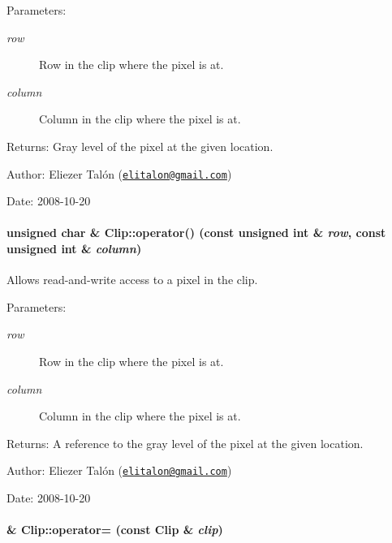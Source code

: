 \begin{Desc}
\item[Parameters:]
\begin{description}
\item[{\em row}]Row in the clip where the pixel is at. \item[{\em column}]Column in the clip where the pixel is at.\end{description}
\end{Desc}
\begin{Desc}
\item[Returns:]Gray level of the pixel at the given location.\end{Desc}
\begin{Desc}
\item[Author:]Eliezer Talón (\href{mailto:elitalon@gmail.com}{\tt elitalon@gmail.com}) \end{Desc}
\begin{Desc}
\item[Date:]2008-10-20 \end{Desc}
\hypertarget{class_clip_0f80c2b0f0f177fe9c780c93596f77be}{
\paragraph[{operator()}]{\setlength{\rightskip}{0pt plus 5cm}unsigned char \& Clip::operator() (const unsigned int \& {\em row}, \/  const unsigned int \& {\em column})}\hfill}
\label{class_clip_0f80c2b0f0f177fe9c780c93596f77be}


Allows read-and-write access to a pixel in the clip. 

\begin{Desc}
\item[Parameters:]
\begin{description}
\item[{\em row}]Row in the clip where the pixel is at. \item[{\em column}]Column in the clip where the pixel is at.\end{description}
\end{Desc}
\begin{Desc}
\item[Returns:]A reference to the gray level of the pixel at the given location.\end{Desc}
\begin{Desc}
\item[Author:]Eliezer Talón (\href{mailto:elitalon@gmail.com}{\tt elitalon@gmail.com}) \end{Desc}
\begin{Desc}
\item[Date:]2008-10-20 \end{Desc}
\hypertarget{class_clip_8f5c91715408d74402666ab79b952edd}{
\paragraph[{operator=}]{ \& Clip::operator= (const {\bf Clip} \& {\em clip})}\hfill}
\label{class_clip_8f5c91715408d74402666ab79b952edd}


